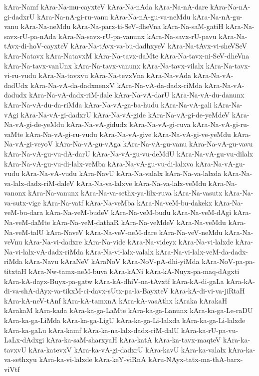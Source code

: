 {kAra-Namf
kAra-Na-mu-cayxteV
kAra-Na-nAda
kAra-Na-nA-dare
kAra-Na-nA-gi-dadxrU
kAra-Na-nA-gi-ru-vanu
kAra-Na-nA-gu-va-neMdu
kAra-Na-nA-gu-vanu
kAra-Na-neMdu
kAra-Na-parx-ti-SeV-dheVna
kAra-Na-saM-gatiH
kAra-Na-savx-rU-pa-nAda
kAra-Na-savx-rU-pa-vanunx
kAra-Na-savx-rU-pavu
kAra-Na-tAvx-di-hoV-cayxteV
kAra-Na-tAvx-va-bu-dadhxyeV
kAra-Na-tAvx-vi-sheVSeV
kAra-Natavx
kAra-NatavxM
kAra-Na-tavx-daMte
kAra-Na-tavx-ni-SeV-dheVna
kAra-Na-tavx-vanUnx
kAra-Na-tavx-vanunx
kAra-Na-tavx-vilalx
kAra-Na-tavx-vi-ru-vudu
kAra-Na-tavxvu
kAra-Na-tevxVna
kAra-Na-vAda
kAra-Na-vA-dadUdx
kAra-Na-vA-da-dadxnenxV
kAra-Na-vA-da-dadx-riMda
kAra-Na-vA-dadudx
kAra-Na-vA-dadx-riM-dale
kAra-Na-vA-darU
kAra-Na-vA-du-danunx
kAra-Na-vA-du-da-riMda
kAra-Na-vA-ga-ba-hudu
kAra-Na-vA-gali
kAra-Na-vAgi
kAra-Na-vA-gi-dadxrU
kAra-Na-vA-gide
kAra-Na-vA-gi-de-yeMdeV
kAra-Na-vA-gi-de-yeMdu
kAra-Na-vA-gidudx
kAra-Na-vA-gi-ruva
kAra-Na-vA-gi-ru-vaMte
kAra-Na-vA-gi-ru-vudu
kAra-Na-vA-give
kAra-Na-vA-gi-ve-yeMdu
kAra-Na-vA-gi-veyoV
kAra-Na-vA-gu-vAga
kAra-Na-vA-gu-vanu
kAra-Na-vA-gu-vavu
kAra-Na-vA-gu-vu-dA-darU
kAra-Na-vA-gu-vu-deMdU
kAra-Na-vA-gu-vu-dilalx
kAra-Na-vA-gu-vu-di-lalx-veMba
kAra-Na-vA-gu-vu-di-lalxvo
kAra-Na-vA-gu-vudu
kAra-Na-vA-vudu
kAra-NavU
kAra-Na-valalx
kAra-Na-va-lalxda
kAra-Na-va-lalx-dadx-riM-daleV
kAra-Na-va-lalxve
kAra-Na-va-lalx-veMdu
kAra-Na-vanonx
kAra-Na-vanunx
kAra-Na-va-sethx-ya-lilx-ruva
kAra-Na-vasutx
kAra-Na-va-sutx-vige
kAra-Na-vatf
kAra-Na-veMba
kAra-Na-veM-bu-dakekx
kAra-Na-veM-bu-dara
kAra-Na-veM-budeV
kAra-Na-veM-budu
kAra-Na-veM-dAgi
kAra-Na-veM-daMte
kAra-Na-veM-dathaR
kAra-Na-veMdeV
kAra-Na-veMdu
kAra-Na-veM-talU
kAra-NaveV
kAra-Na-veV-neM-dare
kAra-Na-veV-neMdu
kAra-Na-veVnu
kAra-Na-vi-dadxre
kAra-Na-vide
kAra-Na-videyx
kAra-Na-vi-lalxde
kAra-Na-vi-lalx-vA-dadx-riMda
kAra-Na-vi-lalx-valalx
kAra-Na-vi-lalx-veM-da-dadx-riMda
kAra-Navu
kAraNeV
kAraNoV
kAra-NoV-pA-dhi-yiMda
kAra-NoV-pa-pa-titxtaH
kAra-Nw-tamx-neM-buva
kAra-kANi
kAra-kA-Nuyx-pa-maq-dAgxti
kAra-kA-dayx-Buyx-pa-gatw
kAra-kA-dhiV-na-tAvxtf
kAra-kA-di-gaLa
kAra-kA-di-va-shA-dAyx-va-tikxM-ci-davx-sUtx-pa-la-BayxteV
kAra-kA-di-vi-va-jiRtaH
kAra-kA-neV-tAnf
kAra-kA-tamxnA
kAra-kA-vasAthx
kAraka
kArakaH
kArakaM
kAra-kada
kAra-ka-ga-LaMte
kAra-ka-ga-Lanunx
kAra-ka-ga-Le-raDU
kAra-ka-ga-LiMda
kAra-ka-ga-LigU
kAra-ka-ga-Li-lalxda
kAra-ka-ga-Li-lalxde
kAra-ka-gaLu
kAra-kamf
kAra-ka-na-lalx-dadx-riM-dalU
kAra-ka-rU-pa-vu-LaLx-dAdxgi
kAra-ka-saM-sharxyaH
kAra-katA
kAra-ka-tavx-maqteV
kAra-ka-tavxvU
kAra-katevxV
kAra-ka-vA-gi-dadxrU
kAra-kavU
kAra-ka-valalx
kAra-ka-va-sethxyu
kAra-ka-vi-lalxde
kAra-keY-viRnA
kAru-NAyx-tatx-ma-thA-barx-viVtf
}
